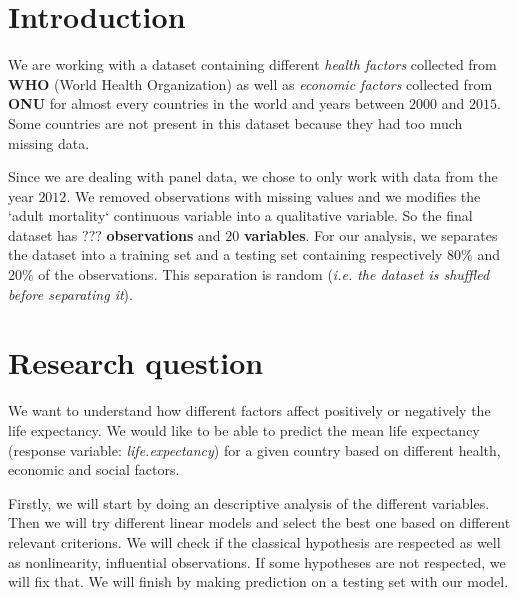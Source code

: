 \section{Introduction}

We are working with a dataset containing different \textit{health factors} collected from \textbf{WHO} (World Health Organization) as well as \textit{economic factors} collected from \textbf{ONU} for almost every countries in the world and years between $2000$ and $2015$. Some countries are not present in this dataset because they had too much missing data. 

Since we are dealing with panel data, we chose to only work with data from the year $2012$. We removed observations with missing values and we modifies the `adult mortality` continuous variable into a qualitative variable. So the final dataset has $???$ \textbf{observations} and $20$ \textbf{variables}. For our analysis, we separates the dataset into a training set and a testing set containing respectively $80\%$ and $20\%$ of the observations. This separation is random (\textit{i.e. the dataset is shuffled before separating it}).

\section{Research question}
We want to understand how different factors affect positively or negatively the life expectancy. We would like to be able to predict the mean life expectancy (response variable: \textit{life.expectancy}) for a given country based on different health, economic and social factors.

Firstly, we will start by doing an descriptive analysis of the different variables. Then we will try different linear models and select the best one based on different relevant criterions. We will check if the classical hypothesis are respected as well as nonlinearity, influential observations. If some hypotheses are not respected, we will fix that.
We will finish by making prediction on a testing set with our model.